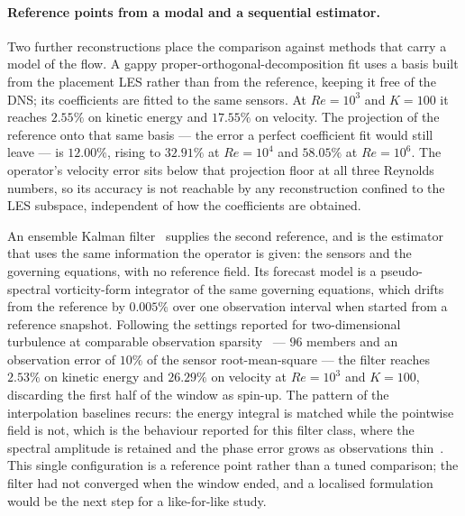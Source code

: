 \paragraph{Reference points from a modal and a sequential estimator.}
Two further reconstructions place the comparison against methods that carry a model of the flow. A gappy proper-orthogonal-decomposition fit uses a basis built from the placement LES rather than from the reference, keeping it free of the DNS; its coefficients are fitted to the same sensors. At $Re=10^{3}$ and $K=100$ it reaches $2.55\%$ on kinetic energy and $17.55\%$ on velocity. The projection of the reference onto that same basis --- the error a perfect coefficient fit would still leave --- is $12.00\%$, rising to $32.91\%$ at $Re=10^{4}$ and $58.05\%$ at $Re=10^{6}$. The operator's velocity error sits below that projection floor at all three Reynolds numbers, so its accuracy is not reachable by any reconstruction confined to the LES subspace, independent of how the coefficients are obtained.

An ensemble Kalman filter~\cite{Houtekamer2001Sequential} supplies the second reference, and is the estimator that uses the same information the operator is given: the sensors and the governing equations, with no reference field. Its forecast model is a pseudo-spectral vorticity-form integrator of the same governing equations, which drifts from the reference by $0.005\%$ over one observation interval when started from a reference snapshot. Following the settings reported for two-dimensional turbulence at comparable observation sparsity~\cite{Hasegawa2023LBMLETKF} --- $96$ members and an observation error of $10\%$ of the sensor root-mean-square --- the filter reaches $2.53\%$ on kinetic energy and $26.29\%$ on velocity at $Re=10^{3}$ and $K=100$, discarding the first half of the window as spin-up. The pattern of the interpolation baselines recurs: the energy integral is matched while the pointwise field is not, which is the behaviour reported for this filter class, where the spectral amplitude is retained and the phase error grows as observations thin~\cite{Hasegawa2023LBMLETKF}. This single configuration is a reference point rather than a tuned comparison; the filter had not converged when the window ended, and a localised formulation~\cite{Hunt2007LETKF, Hamill2001Localization} would be the next step for a like-for-like study.


